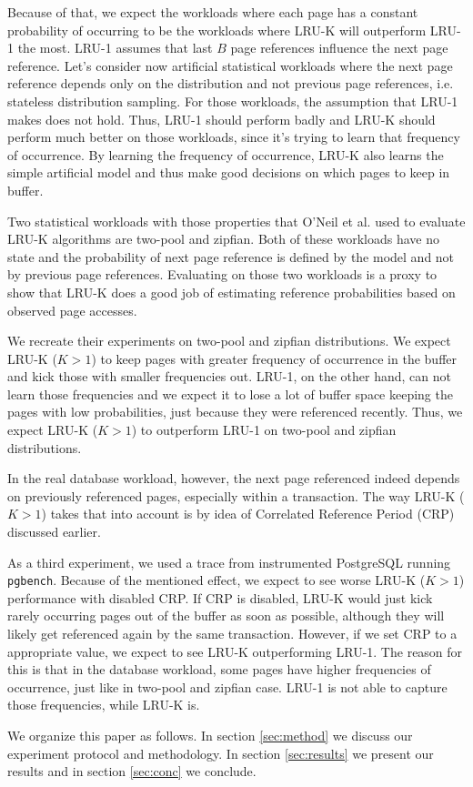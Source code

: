 Because of that, we expect the workloads where each page has a constant probability of occurring to be the workloads where LRU-K will outperform LRU-1 the most. LRU-1 assumes that last $B$ page references influence the next page reference. Let's consider now artificial statistical workloads where the next page reference depends only on the distribution and not previous page references, i.e. stateless distribution sampling. For those workloads, the assumption that LRU-1 makes does not hold. Thus, LRU-1 should perform badly and LRU-K should perform much better on those workloads, since it's trying to learn that frequency of occurrence. By learning the frequency of occurrence, LRU-K also learns the simple artificial model and thus make good decisions on which pages to keep in buffer.

Two statistical workloads with those properties that O'Neil et al. used to evaluate LRU-K algorithms are two-pool and zipfian. Both of these workloads have no state and the probability of next page reference is defined by the model and not by previous page references. Evaluating on those two workloads is a proxy to show that LRU-K does a good job of estimating reference probabilities based on observed page accesses.

We recreate their experiments on two-pool and zipfian distributions. We expect LRU-K ($K > 1$) to keep pages with greater frequency of occurrence in the buffer and kick those with smaller frequencies out. LRU-1, on the other hand, can not learn those frequencies and we expect it to lose a lot of buffer space keeping the pages with low probabilities, just because they were referenced recently. Thus, we expect LRU-K ($K > 1$) to outperform LRU-1 on two-pool and zipfian distributions.

In the real database workload, however, the next page referenced indeed depends on previously referenced pages, especially within a transaction. The way LRU-K ($K > 1$) takes that into account is by idea of Correlated Reference Period (CRP) discussed earlier.

As a third experiment, we used a trace from instrumented PostgreSQL running \texttt{pgbench}. Because of the mentioned effect, we expect to see worse LRU-K ($K > 1$) performance with disabled CRP. If CRP is disabled, LRU-K would just kick rarely occurring pages out of the buffer as soon as possible, although they will likely get referenced again by the same transaction. However, if we set CRP to a appropriate value, we expect to see LRU-K outperforming LRU-1. The reason for this is that in the database workload, some pages have higher frequencies of occurrence, just like in two-pool and zipfian case. LRU-1 is not able to capture those frequencies, while LRU-K is.

We organize this paper as follows. In section \ref{sec:method} we discuss our experiment protocol and methodology. In section \ref{sec:results} we present our results and in section \ref{sec:conc} we conclude.